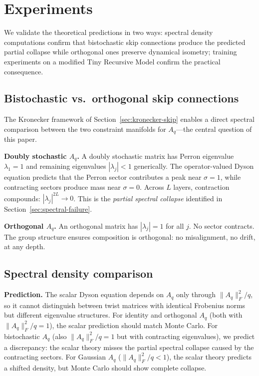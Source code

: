 
\section{Experiments}\label{sec:experiments}

We validate the theoretical predictions in two ways: spectral density computations confirm that bistochastic skip connections produce the predicted partial collapse while orthogonal ones preserve dynamical isometry; training experiments on a modified Tiny Recursive Model confirm the practical consequence.

\subsection{Bistochastic vs.\ orthogonal skip connections}\label{sec:bistochastic-vs-ortho}

The Kronecker framework of Section~\ref{sec:kronecker-skip} enables a direct spectral comparison between the two constraint manifolds for $A_q$---the central question of this paper.

\medskip
\noindent\textbf{Doubly stochastic $A_q$.}
A doubly stochastic matrix has Perron eigenvalue $\lambda_1 = 1$ and remaining eigenvalues $|\lambda_j| < 1$ generically. The operator-valued Dyson equation predicts that the Perron sector contributes a peak near $\sigma = 1$, while contracting sectors produce mass near $\sigma = 0$. Across $L$ layers, contraction compounds: $|\lambda_j|^{2L} \to 0$. This is the \emph{partial spectral collapse} identified in Section~\ref{sec:spectral-failure}.

\medskip
\noindent\textbf{Orthogonal $A_q$.}
An orthogonal matrix has $|\lambda_j| = 1$ for all $j$. No sector contracts. The group structure ensures composition is orthogonal: no misalignment, no drift, at any depth.

\subsection{Spectral density comparison}\label{sec:spectral-experiments}

\noindent\textbf{Prediction.}
The scalar Dyson equation depends on $A_q$ only through $\|A_q\|_F^2/q$, so it cannot distinguish between twist matrices with identical Frobenius norms but different eigenvalue structures. For identity and orthogonal $A_q$ (both with $\|A_q\|_F^2/q = 1$), the scalar prediction should match Monte Carlo. For bistochastic $A_q$ (also $\|A_q\|_F^2/q = 1$ but with contracting eigenvalues), we predict a discrepancy: the scalar theory misses the partial spectral collapse caused by the contracting sectors. For Gaussian $A_q$ ($\|A_q\|_F^2/q < 1$), the scalar theory predicts a shifted density, but Monte Carlo should show complete collapse.

